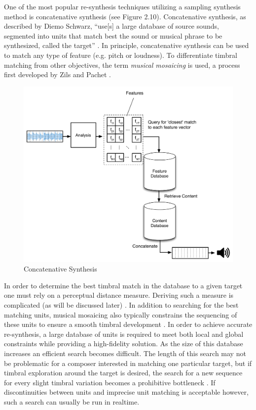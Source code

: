 \documentclass[a4paper,12pt]{report} 	%
\numberwithin{figure}{chapter}
\numberwithin{table}{chapter}
\numberwithin{equation}{chapter}
\begin{document}
\begin{flushleft}
One of the most popular re-synthesis techniques utilizing a sampling synthesis method is concatenative synthesis (see Figure 2.10). Concatenative synthesis, as described by Diemo Schwarz, ``use[s] a large database of source sounds, segmented into units that match best the sound or musical phrase to be synthesized, called the target'' \cite[p. 1]{Schwarz:2006gr}. In principle, concatenative synthesis can be used to match any type of feature (e.g. pitch or loudness). To differentiate timbral matching from other objectives, the term \emph{musical mosaicing} is used, a process first developed by Zils and Pachet \cite{Zils:2001bd}. 
\\
\begin{figure}[h!]
\begin{center}
\includegraphics[scale=0.55]{ConcatSynth}
\caption[Concatenative Synthesis]{Concatenative Synthesis}
\end{center}
\end{figure}
In order to determine the best timbral match in the database to a given target one must rely on a perceptual distance measure. Deriving such a measure is complicated (as will be discussed later) \cite[p. 13]{Schwarz:2006gr}. In addition to searching for the best matching units, musical mosaicing also typically constrains the sequencing of these units to ensure a smooth timbral development \cite[p. 1]{Zils:2001bd}. In order to achieve accurate re-synthesis, a large database of units is required to meet both local and global constraints while providing a high-fidelity solution. As the size of this database increases an efficient search becomes difficult. The length of this search may not be problematic for a composer interested in matching one particular target, but if timbral exploration around the target is desired, the search for a new sequence for every slight timbral variation becomes a prohibitive bottleneck \cite[p. 11]{Schwarz:2006gr}.  If discontinuities between units and imprecise unit matching is acceptable however, such a search can usually be run in realtime.


\end{flushleft}
\end{document}
